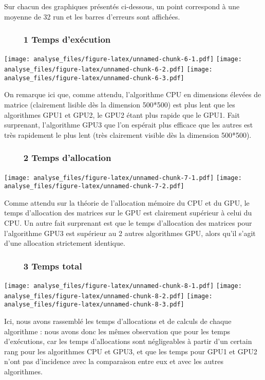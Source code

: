 \documentclass[]{article}
\begin{document}
Sur chacun des graphiques présentés ci-dessous, un point correspond à
une moyenne de 32 run et les barres d'erreurs sont affichées.

\subsubsection{~~~~1 Temps d'exécution}\label{temps-dexecution}

\texttt{[image: analyse\_files/figure-latex/unnamed-chunk-6-1.pdf]}
\texttt{[image: analyse\_files/figure-latex/unnamed-chunk-6-2.pdf]}
\texttt{[image: analyse\_files/figure-latex/unnamed-chunk-6-3.pdf]}

On remarque ici que, comme attendu, l'algorithme CPU en dimensions
élevées de matrice (clairement lisible dès la dimension 500*500) est
plus lent que les algorithmes GPU1 et GPU2, le GPU2 étant plus rapide
que le GPU1. Fait surprenant, l'algorithme GPU3 que l'on espérait plus
efficace que les autres est très rapidement le plus lent (très
clairement visible dès la dimension 500*500).

\subsubsection{~~~~2 Temps d'allocation}\label{temps-dallocation}

\texttt{[image: analyse\_files/figure-latex/unnamed-chunk-7-1.pdf]}
\texttt{[image: analyse\_files/figure-latex/unnamed-chunk-7-2.pdf]}

Comme attendu sur la théorie de l'allocation mémoire du CPU et du GPU,
le temps d'allocation des matrices sur le GPU est clairement supérieur à
celui du CPU. Un autre fait surprenant est que le temps d'allocation des
matrices pour l'algorithme GPU3 est supérieur au 2 autres algorithmes
GPU, alors qu'il s'agit d'une allocation strictement identique.

\subsubsection{~~~~3 Temps total}\label{temps-total}

\texttt{[image: analyse\_files/figure-latex/unnamed-chunk-8-1.pdf]}
\texttt{[image: analyse\_files/figure-latex/unnamed-chunk-8-2.pdf]}
\texttt{[image: analyse\_files/figure-latex/unnamed-chunk-8-3.pdf]}

Ici, nous avons rassemblé les temps d'allocations et de calculs de
chaque algorithme : nous avons donc les mêmes observation que pour les
temps d'exécutions, car les temps d'allocations sont négligeables à
partir d'un certain rang pour les algorithmes CPU et GPU3, et que les
temps pour GPU1 et GPU2 n'ont pas d'incidence avec la comparaison entre
eux et avec les autres algorithmes.
\end{document}
